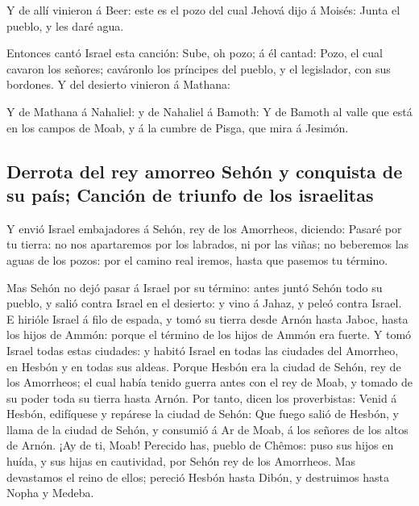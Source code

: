  Y de allí vinieron á Beer: este es el pozo del cual Jehová
dijo á Moisés: Junta el pueblo, y les daré agua.

 Entonces cantó Israel esta canción: Sube, oh pozo; á él
cantad:  Pozo, el cual cavaron los señores; caváronlo los
príncipes del pueblo, y el legislador, con sus bordones. Y del desierto
vinieron á Mathana:

 Y de Mathana á Nahaliel: y de Nahaliel á Bamoth:
 Y de Bamoth al valle que está en los campos de Moab, y á
la cumbre de Pisga, que mira á Jesimón.

\hypertarget{derrota-del-rey-amorreo-sehuxf3n-y-conquista-de-su-pauxeds-canciuxf3n-de-triunfo-de-los-israelitas}{%
\subsection{Derrota del rey amorreo Sehón y conquista de su país;
Canción de triunfo de los
israelitas}\label{derrota-del-rey-amorreo-sehuxf3n-y-conquista-de-su-pauxeds-canciuxf3n-de-triunfo-de-los-israelitas}}

 Y envió Israel embajadores á Sehón, rey de los Amorrheos,
diciendo:  Pasaré por tu tierra: no nos apartaremos por los
labrados, ni por las viñas; no beberemos las aguas de los pozos: por el
camino real iremos, hasta que pasemos tu término.

 Mas Sehón no dejó pasar á Israel por su término: antes
juntó Sehón todo su pueblo, y salió contra Israel en el desierto: y vino
á Jahaz, y peleó contra Israel.  E hirióle Israel á filo de
espada, y tomó su tierra desde Arnón hasta Jaboc, hasta los hijos de
Ammón: porque el término de los hijos de Ammón era fuerte. 
Y tomó Israel todas estas ciudades: y habitó Israel en todas las
ciudades del Amorrheo, en Hesbón y en todas sus aldeas. 
Porque Hesbón era la ciudad de Sehón, rey de los Amorrheos; el cual
había tenido guerra antes con el rey de Moab, y tomado de su poder toda
su tierra hasta Arnón.  Por tanto, dicen los proverbistas:
Venid á Hesbón, edifíquese y repárese la ciudad de Sehón: 
Que fuego salió de Hesbón, y llama de la ciudad de Sehón, y consumió á
Ar de Moab, á los señores de los altos de Arnón.  ¡Ay de
ti, Moab! Perecido has, pueblo de Chêmos: puso sus hijos en huída, y sus
hijas en cautividad, por Sehón rey de los Amorrheos.  Mas
devastamos el reino de ellos; pereció Hesbón hasta Dibón, y destruimos
hasta Nopha y Medeba.

